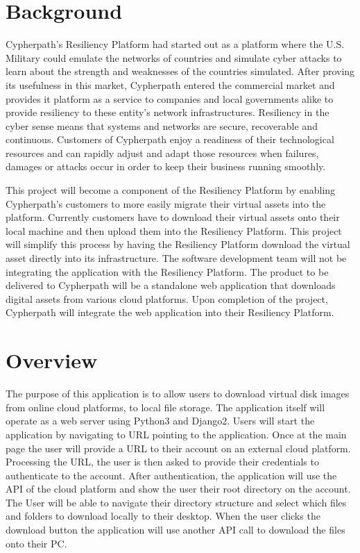 \documentclass{article}
\begin{document}
    \section{Background}
    Cypherpath's Resiliency Platform had started out as a platform where the U.S. Military could emulate the networks of countries and simulate cyber attacks to
    learn about the strength and weaknesses of the countries simulated. After proving its usefulness in this market, Cypherpath entered the commercial market and provides it platform as a service to
    companies and local governments alike to provide resiliency to these entity's network infrastructures. Resiliency in the cyber sense means that systems and networks are secure, recoverable and
    continuous. Customers of Cypherpath enjoy a readiness of their technological resources and can rapidly adjust and adapt those resources when failures, damages or attacks occur in order to keep their business running smoothly.

    This project will become a component of the Resiliency Platform by enabling Cypherpath's customers to more easily migrate their virtual assets into the platform. Currently customers have to download
    their virtual assets onto their local machine and then upload them into the Resiliency Platform. This project will simplify this process by having the Resiliency Platform download the virtual asset directly
    into its infrastructure. The software development team will not be integrating the application with the Resiliency Platform. The product to be delivered to Cypherpath will be a standalone web application that downloads
    digital assets from various cloud platforms. Upon completion of the project, Cypherpath will integrate the web application into their Resiliency Platform.


	
    \section{Overview}
    The purpose of this application is to allow users to download virtual disk images from online cloud platforms, to local file storage.
    The application itself will operate as a web server using Python3 and Django2. Users will start the application by navigating to URL pointing to the application.
    Once at the main page the user will
    provide a URL to their account on an external cloud platform. Processing the URL, the user is then asked to provide their credentials to authenticate
    to the account. After authentication, the application will use the API of the cloud platform and show the user their root directory on the account.
    The User will be able to navigate their directory structure and select which files and folders to download locally to their desktop.
    When the user clicks the download button the application will use another API call to download the files onto their PC.
\end{document}
